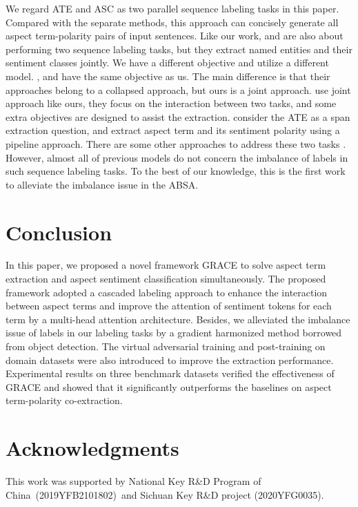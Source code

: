 \documentclass[11pt,a4paper]{article}
\begin{document}
We regard ATE and ASC as two parallel sequence labeling tasks in this paper. Compared with the separate methods, this approach can concisely generate all aspect term-polarity pairs of input sentences. Like our work, \citet{Mitchell2013} and \citet{Zhang2015} are also about performing two sequence labeling tasks, but they extract named entities and their sentiment classes jointly. We have a different objective and utilize a different model. \citet{Li2017}, \citet{ma-etal-2018-joint} and \citet{Li2019a} have the same objective as us. The main difference is that their approaches belong to a collapsed approach, but ours is a joint approach. \citet{Luo2019} use joint approach like ours, they focus on the interaction between two tasks, and some extra objectives are designed to assist the extraction. \citet{Hu2019} consider the ATE as a span extraction question, and extract aspect term and its sentiment polarity using a pipeline approach. There are some other approaches to address these two tasks \cite{Li2019b,He2019,Liang2020a,Peng2020,Wan2020,Liang2020,Liu2020,chen2020racl}. However, almost all of previous models do not concern the imbalance of labels in such sequence labeling tasks. To the best of our knowledge, this is the first work to alleviate the imbalance issue in the ABSA.

\section{Conclusion}
\label{sec_conclusion}
In this paper, we proposed a novel framework GRACE to solve aspect term extraction and aspect sentiment classification simultaneously. The proposed framework adopted a cascaded labeling approach to enhance the interaction between aspect terms and improve the attention of sentiment tokens for each term by a multi-head attention architecture. Besides, we alleviated the imbalance issue of labels in our labeling tasks by a gradient harmonized method borrowed from object detection. The virtual adversarial training and post-training on domain datasets were also introduced to improve the extraction performance. Experimental results on three benchmark datasets verified the effectiveness of GRACE and showed that it significantly outperforms the baselines on aspect term-polarity co-extraction.

\section*{Acknowledgments}
This work was supported by National Key R\&D Program of China (2019YFB2101802) and Sichuan Key R\&D project (2020YFG0035).



\end{document}
